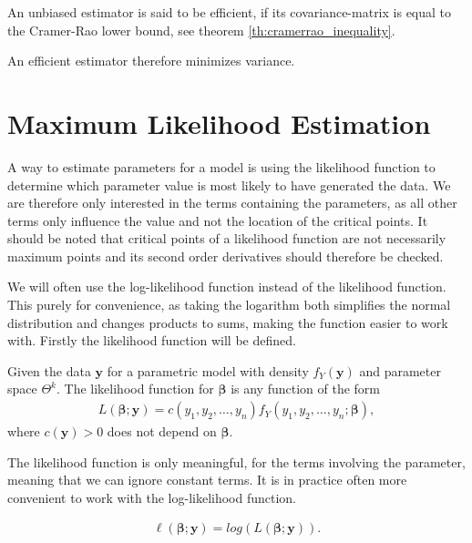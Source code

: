 \begin{definition} 
\label{def:efficient_estimator}
An unbiased estimator is said to be efficient, if its covariance-matrix is equal to the Cramer-Rao lower bound, see theorem \ref{th:cramerrao_inequality}.
\end{definition}

An efficient estimator therefore minimizes variance. 
 
\section{Maximum Likelihood Estimation}

A way to estimate parameters for a model is using the likelihood function to determine which parameter value is most likely to have generated the data. We are therefore only interested in the terms containing the parameters, as all other terms only influence the value and not the location of the critical points. It should be noted that critical points of a likelihood function are not necessarily maximum points and its second order derivatives should therefore be checked.   

We will often use the log-likelihood function instead of the likelihood function. This purely for convenience, as taking the logarithm both simplifies the normal distribution and changes products to sums, making the function easier to work with. Firstly the likelihood function will be defined.

\begin{definition} 
\label{def:likelihood_function}
Given the data $\textbf{y}$ for a parametric model with density $f_Y(\textbf{y})$ and parameter space $\Theta^k$. The likelihood function for $\boldsymbol{\beta}$ is any function of the form 
\begin{align*}
    L(\boldsymbol{\beta}; \textbf{y}) = c(y_1, y_2, \ldots, y_n)f_Y(y_1, y_2, \ldots, y_n; \boldsymbol{\beta}), 
\end{align*}
where $c(\textbf{y})>0$ does not depend on $\boldsymbol{\beta}$. 
\end{definition}

The likelihood function is only meaningful, for the terms involving the parameter, meaning that we can ignore constant terms. It is in practice often more convenient to work with the log-likelihood function. 

\begin{align*}
    \ell(\boldsymbol{\beta};\textbf{y})=log(L(\boldsymbol{\beta}; \textbf{y})).
\end{align*}

